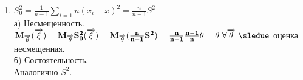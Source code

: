 \begin{proofs}
\begin{dokvo}
\begin{enumerate}
        \item $S_0^2 = \frac{1}{n-1}\sum\limits_{i=1}n(x_i-\overline{x})^2 = \frac{n}{n-1}S^2$\\
        а) Несмещенность.\\
        $\bf{M}_{\overrightarrow{\theta}}(\overrightarrow{\xi}) = \bf{M}_{\overrightarrow{\theta}}S_0^2(\overrightarrow{\xi}) =
        \bf{M}_{\overrightarrow{\theta}}(\frac{n}{n-1}S^2) = \frac{n}{n-1}\frac{n-1}{n}\theta = \theta \ \forall \overrightarrow{\theta} \ \sledue$
        оценка несмещенная.\\
        б) Состоятельность.\\
        Аналогично $S^2$.


      \end{enumerate}
  \end{dokvo}
\end{proofs}
